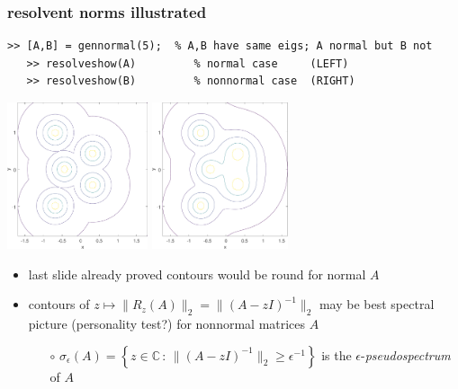\documentclass[10pt,hyperref]{beamer}
\newcommand{\CC}{\mathbb{C}}
\newcommand{\eps}{\epsilon}
\begin{document}
\begin{frame}[fragile]
\frametitle{resolvent norms illustrated}

\begin{Verbatim}[fontsize=\footnotesize]
   >> [A,B] = gennormal(5);  % A,B have same eigs; A normal but B not
   >> resolveshow(A)         % normal case     (LEFT)
   >> resolveshow(B)         % nonnormal case  (RIGHT)
\end{Verbatim}

\bigskip
\begin{center}
\includegraphics[width=0.31\textwidth]{figs/resolvenormal} \hspace{20mm} \includegraphics[width=0.3\textwidth]{figs/resolvenonnormal}
\end{center}

\small
\begin{itemize}
\item last slide already proved contours would be round for normal $A$
\item contours of $z\mapsto\|R_z(A)\|_2= \|(A-z I)^{-1}\|_2$ may be best spectral picture (personality test?) for nonnormal matrices $A$
    \begin{itemize}
    \item[$\circ$] $\sigma_\eps(A) = \left\{z\in\CC\,:\, \|(A-z I)^{-1}\|_2 \ge \eps^{-1}\right\}$ is the $\eps$-\emph{pseudospectrum} of $A$
    \end{itemize}
\end{itemize}
\end{frame}
\end{document}
